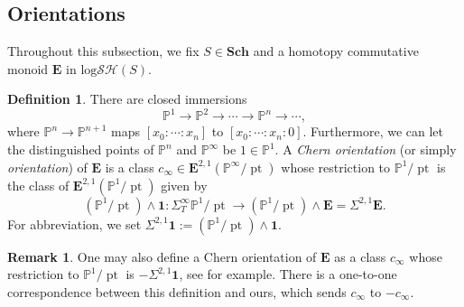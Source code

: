 \documentclass[11pt, a4paper]{amsart}
\theoremstyle{definition}
\newtheorem{df}[thm]{Definition}
\newtheorem{rmk}[thm]{Remark}
\numberwithin{equation}{subsection}
\renewcommand{\P}{\mathbb{P}}
\newcommand{\Sch}{\mathbf{Sch}}
\newcommand{\pt}[1]{\mathrm{\pt}_{#1}}
\def\pt{\operatorname{pt}}
\newcommand{\unit}{\mathbf{1}}
\newcommand{\ringE}{\mathbf{E}}
\newcommand{\inflogSH}{\mathrm{log}\mathcal{SH}}
\begin{document}
\subsection{Orientations}
\label{ori}
Throughout this subsection, we fix $S\in \Sch$ and a homotopy commutative monoid $\ringE$ in $\inflogSH(S)$.

\begin{df}
\label{Ori.7}
There are closed immersions
\[
\P^1\to \P^2\to \cdots \to \P^n \to \cdots,
\]
where $\P^n\to \P^{n+1}$ maps $[x_0:\cdots:x_n]$ to $[x_0:\cdots:x_n:0]$.
Furthermore, we can let the distinguished points of $\P^n$ and $\P^\infty$ be $1\in \P^1$.
A \emph{Chern orientation} (or simply \emph{orientation}) of $\ringE$ is a class $c_\infty \in \ringE^{2,1}(\P^\infty/\pt)$ whose restriction to $\P^1/\pt$ is the class of $\ringE^{2,1}(\P^1/\pt)$ given by
\[
(\P^1/\pt)\wedge \unit
\colon
\Sigma_T^\infty \P^1/\pt \to (\P^1/\pt) \wedge \ringE=\Sigma^{2,1}\ringE.
\]
For abbreviation, we set $\Sigma^{2,1}\unit := (\P^1/\pt)\wedge \unit$.
\end{df}

\begin{rmk}
One may also define a Chern orientation of $\ringE$ as a class $c_\infty$ whose restriction to $\P^1/\pt$ is $-\Sigma^{2,1}\unit$, see \cite[Definition 1.2]{zbMATH05367298} for example.
There is a one-to-one correspondence between this definition and ours, which sends $c_\infty$ to $-c_\infty$.
\end{rmk}
\end{document}

